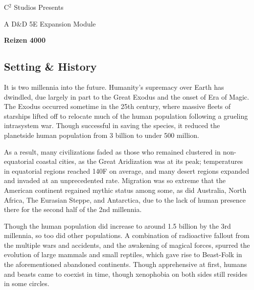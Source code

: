 \documentclass[12pt, landscape]{article}
\begin{document}
	\begin{Center}
		\large
		C$^2$ Studios Presents

		\Large
		A D\&D 5E Expansion Module

		\LARGE
		\textbf{Reizen 4000}
	\end{Center}

	\begin{FlushLeft}
		\small
		\begin{multicols}{2}
			\tableofcontents
			\columnbreak \null
		\end{multicols}
		\pagebreak

		\begin{multicols}{3}
			\section{Setting \& History}
			It is two millennia into the future. Humanity’s supremacy over Earth has dwindled, due largely in part to the Great Exodus and the onset of Era of Magic. The Exodus occurred sometime in the 25th century, where massive fleets of starships lifted off to relocate much of the human population following a grueling intrasystem war. Though successful in saving the species, it reduced the planetside human population from 3 billion to under 500 million. \linebreak

			As a result, many civilizations faded as those who remained clustered in non-equatorial coastal cities, as the Great Aridization was at its peak; temperatures in equatorial regions reached 140F on average, and many desert regions expanded and invaded at an unprecedented rate. Migration was so extreme that the American continent regained mythic status among some, as did Australia, North Africa, The Eurasian Steppe, and Antarctica, due to the lack of human presence there for the second half of the 2nd millennia. \vfill \null \columnbreak

			Though the human population did increase to around 1.5 billion by the 3rd millennia, so too did other populations. A combination of radioactive fallout from the multiple wars and accidents, and the awakening of magical forces, spurred the evolution of large mammals and small reptiles, which gave rise to Beast-Folk in the aforementioned abandoned continents. Though apprehensive at first, humans and beasts came to coexist in time, though xenophobia on both sides still resides in some circles. \linebreak


\end{multicols}
\end{FlushLeft}
\end{document}
